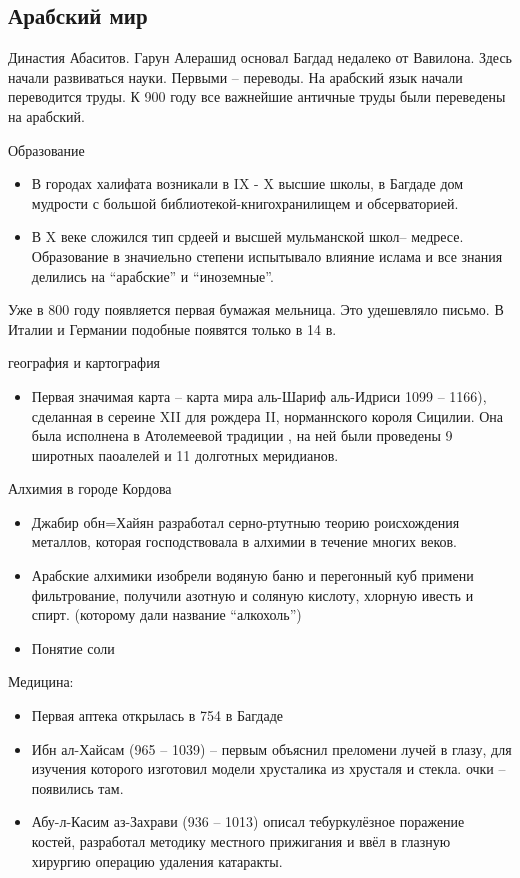 \documentclass{book}
\theoremstyle{definition}
\begin{document}
    \subsection{Арабский мир}

    Династия Абаситов. Гарун Алерашид основал Багдад недалеко от Вавилона. Здесь начали развиваться науки. Первыми -- переводы. На арабский язык начали переводится труды. К 900 году все важнейшие античные труды были переведены на арабский.

    Образование
    \begin{itemize}
        \item В городах халифата возникали в IX - X высшие школы, в Багдаде дом мудрости с большой библиотекой-книгохранилищем и обсерваторией.
        \item В X веке сложился тип срдеей и высшей мульманской школ-- медресе. Образование в значиельно степени испытывало влияние ислама и все знания делились на ``арабские'' и ``иноземные''.
    \end{itemize}

    Уже в 800 году появляется первая бумажая мельница. Это удешевляло письмо. В Италии и Германии подобные появятся только в 14 в.

    география и картография
    \begin{itemize}
        \item Первая значимая карта -- карта мира аль-Шариф аль-Идриси 1099 -- 1166), сделанная в сереине XII для рождера II, норманнского короля Сицилии. Она была исполнена в Атолемеевой традиции , на ней были проведены 9 широтных паоалелей и 11 долготных меридианов.
    \end{itemize}

    Алхимия в городе Кордова
    \begin{itemize}
        \item Джабир обн=Хайян разработал серно-ртутныю теорию роисхождения металлов, которая господствовала в алхимии в течение многих веков.
        \item Арабские алхимики изобрели водяную баню и перегонный куб примени фильтрование, получили азотную и соляную кислоту, хлорную ивесть и спирт. (которому дали название ``алкохоль'')
        \item Понятие соли
    \end{itemize}

    Медицина:
    \begin{itemize}
        \item Первая аптека открылась в 754 в Багдаде
        \item Ибн ал-Хайсам (965 -- 1039) -- первым объяснил преломени лучей в глазу, для изучения которого изготовил модели хрусталика из хрусталя и стекла. очки -- появились там.
        \item Абу-л-Касим аз-Захрави (936 -- 1013) описал тебуркулёзное поражение костей, разработал методику местного прижигания и ввёл в глазную хирургию операцию удаления катаракты.
    \end{itemize}
\end{document}
